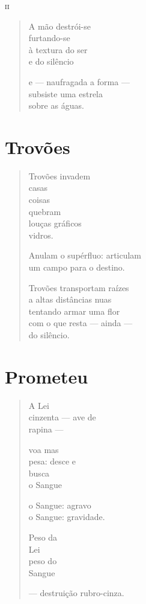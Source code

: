 \medskip
\textsc{ii}

\begin{verse}
A mão destrói-se\\
furtando-se\\
à textura do ser\\
e do silêncio

e --- naufragada a forma ---\\
subsiste uma estrela\\
sobre as águas.
\end{verse}

\chapter{Trovões}

\begin{verse}
Trovões invadem\\
casas\\
coisas\\
quebram\\
louças gráficos\\
\qquad\qquad\qquad vidros.

Anulam o supérfluo: articulam\\
um campo para o destino.

Trovões transportam raízes\\
a altas distâncias nuas\\
tentando armar uma flor\\
com o que resta --- ainda ---\\
do silêncio.
\end{verse}

\chapter{Prometeu}

\begin{verse}
A Lei\\
cinzenta --- ave de\\
\qquad\qquad\qquad\quad rapina ---

voa mas\\
pesa: desce e\\
\qquad\qquad\quad busca\\
\qquad\qquad\quad o Sangue

o Sangue: agravo\\
o Sangue: gravidade.

Peso da\\
Lei\\
peso do\\
Sangue

--- destruição rubro-cinza.
\end{verse}

